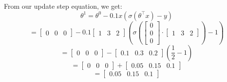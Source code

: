 \documentclass[a4paper]{article}
\theoremstyle{definition}
\newenvironment{soln}{
    \leavevmode\color{blue}\ignorespaces
}{}
\begin{document}
\begin{enumerate}
\begin{enumerate}
	\begin{soln}
		From our update step equation, we get:
		$$\theta^{1} = \theta^{0} - 0.1 x \left(\sigma(\theta^\top x) - y\right)$$
		$$= \begin{bmatrix}0&0&0\end{bmatrix} - 0.1\begin{bmatrix}1&3&2\end{bmatrix}\left(\sigma\left(\begin{bmatrix}0\\0\\0\end{bmatrix} \cdot \begin{bmatrix}1 & 3 & 2\end{bmatrix}\right) - 1\right)$$
		$$= \begin{bmatrix}0&0&0\end{bmatrix} - \begin{bmatrix}0.1&0.3&0.2\end{bmatrix}\left(\frac{1}{2} - 1\right)$$
		$$= \begin{bmatrix}0&0&0\end{bmatrix} + \begin{bmatrix}0.05&0.15&0.1\end{bmatrix}$$
		$$= \begin{bmatrix}0.05&0.15&0.1\end{bmatrix}$$
	\end{soln}
\end{enumerate}
\end{enumerate}
\end{document}

